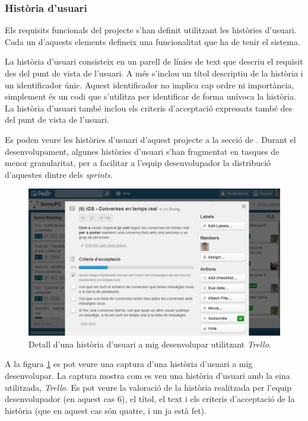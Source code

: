 
\subsubsection{Història d'usuari}
Els requisits funcionals del projecte s'han definit utilitzant les històries d'usuari. Cada un d'aquests elements defineix una funcionalitat que ha de tenir el sistema. 

La història d'usuari consisteix en un parell de línies de text que descriu el requisit des del punt de vista de l'usuari. A més s'inclou un títol descriptiu de la història i un identificador únic. Aquest identificador no implica cap ordre ni importància, simplement és un codi que s'utilitza per identificar de forma unívoca la història. La història d'usuari també inclou els criteris d'acceptació expressats també des del punt de vista de l'usuari.

Es poden veure les històries d'usuari d'aquest projecte a la secció de . Durant el desenvolupament, algunes històries d'usuari s'han fragmentat en tasques de menor granularitat, per a facilitar a l'equip desenvolupador la distribució d'aquestes dintre dels \textit{sprints}.

\begin{figure}[ht]
    \centering
    \includegraphics*[scale=0.60]{GestioProjecte/Metodologia/sprint-backlog-tasca.png}
    \caption{Detall d'una història d'usuari a mig desenvolupar utilitzant \textit{Trello}.}
    \label{fig:sprint-backlog-tasca}
\end{figure}

A la figura \ref{fig:sprint-backlog-tasca} es pot veure una captura d'una història d'usuari a mig desenvolupar. La captura mostra com es veu una història d'usuari amb la eina utilitzada, \textit{Trello}. Es pot veure la valoració de la història realitzada per l'equip desenvolupador (en aquest cas 6), el títol, el text i els criteris d'acceptació de la història (que en aquest cas són quatre, i un ja està fet).


\FloatBarrier 
